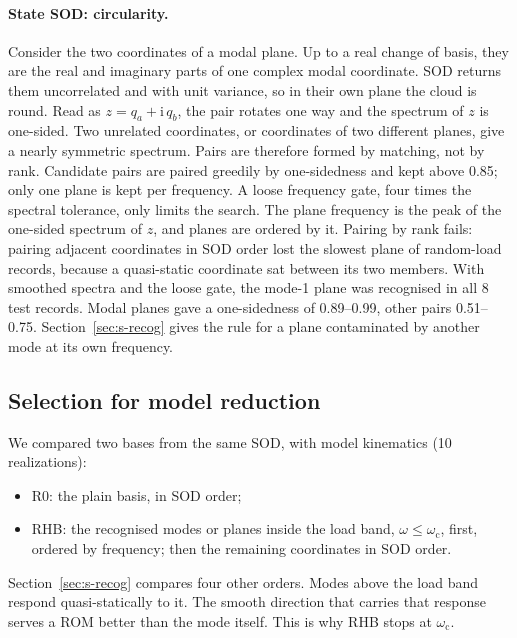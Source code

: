 \documentclass[preprint,12pt]{elsarticle}
\begin{document}
\paragraph{State SOD: circularity.} Consider the two coordinates of a modal plane. Up to a real change of basis, they are the real and imaginary parts of one complex modal coordinate. SOD returns them uncorrelated and with unit variance, so in their own plane the cloud is round. Read as $z=q_a+\mathrm i\,q_b$, the pair rotates one way and the spectrum of $z$ is one-sided. Two unrelated coordinates, or coordinates of two different planes, give a nearly symmetric spectrum.
Pairs are therefore formed by matching, not by rank. Candidate pairs are paired greedily by one-sidedness and kept above 0.85; only one plane is kept per frequency. A loose frequency gate, four times the spectral tolerance, only limits the search. The plane frequency is the peak of the one-sided spectrum of $z$, and planes are ordered by it.
Pairing by rank fails: pairing adjacent coordinates in SOD order lost the slowest plane of random-load records, because a quasi-static coordinate sat between its two members. With smoothed spectra and the loose gate, the mode-1 plane was recognised in all 8 test records. Modal planes gave a one-sidedness of 0.89--0.99, other pairs 0.51--0.75. Section~\ref{sec:s-recog} gives the rule for a plane contaminated by another mode at its own frequency.

\subsection{Selection for model reduction}\label{sec:romsel}
We compared two bases from the same SOD, with model kinematics (10 realizations):
\begin{itemize}
\item R0: the plain basis, in SOD order;
\item RHB: the recognised modes or planes inside the load band, $\omega\le\omega_{\mathrm c}$, first, ordered by frequency; then the remaining coordinates in SOD order.
\end{itemize}
Section~\ref{sec:s-recog} compares four other orders.
Modes above the load band respond quasi-statically to it. The smooth direction that carries that response serves a ROM better than the mode itself. This is why RHB stops at $\omega_{\mathrm c}$.
\end{document}
